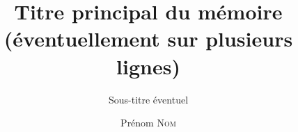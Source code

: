 \documentclass{EPL-master-thesis-covers-FR}
\title{Titre principal du mémoire (éventuellement sur plusieurs lignes)}
\subtitle{Sous-titre éventuel}
\author{Prénom \textsc{Nom}}
\begin{document}
  \maketitle

  \backcoverpage
\end{document}
